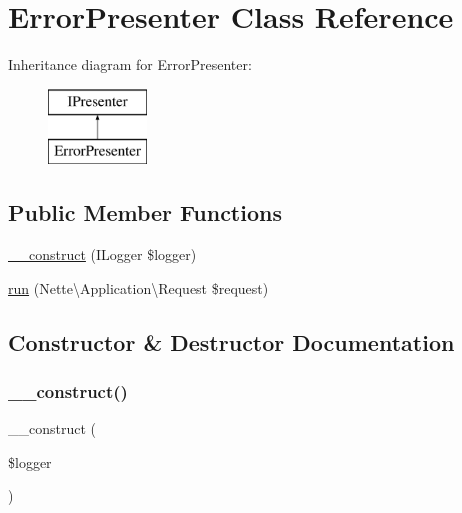 \hypertarget{class_app_1_1_presenters_1_1_error_presenter}{}\section{Error\+Presenter Class Reference}
\label{class_app_1_1_presenters_1_1_error_presenter}
Inheritance diagram for Error\+Presenter\+:\begin{figure}[H]
\begin{center}
\leavevmode
\includegraphics[height=2.000000cm]{class_app_1_1_presenters_1_1_error_presenter}
\end{center}
\end{figure}
\subsection*{Public Member Functions}
\begin{DoxyCompactItemize}
\item 
\mbox{\hyperlink{class_app_1_1_presenters_1_1_error_presenter_a47dfcedb8bbffa17106ec84907a2f101}{\+\_\+\+\_\+construct}} (I\+Logger \$logger)
\item 
\mbox{\hyperlink{class_app_1_1_presenters_1_1_error_presenter_a7d2a09004db8fd54068d96170b66654c}{run}} (Nette\textbackslash{}\+Application\textbackslash{}\+Request \$request)
\end{DoxyCompactItemize}


\subsection{Constructor \& Destructor Documentation}
\mbox{\label{class_app_1_1_presenters_1_1_error_presenter_a47dfcedb8bbffa17106ec84907a2f101}} 
\subsubsection{\texorpdfstring{\+\_\+\+\_\+construct()}{\_\_construct()}}
{\footnotesize\ttfamily \+\_\+\+\_\+construct (\begin{DoxyParamCaption}\item[{I\+Logger}]{\$logger }\end{DoxyParamCaption})}

